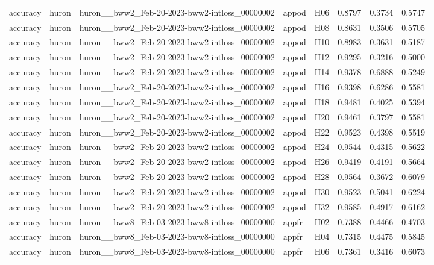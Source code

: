 \begin{table}[tbp]
\begin{tabular}{lllllrrr}
accuracy & huron & huron\_\_bww2\_Feb-20-2023-bww2-intloss\_00000002 & appod & H06 & 0.8797 & 0.3734 & 0.5747 \\
accuracy & huron & huron\_\_bww2\_Feb-20-2023-bww2-intloss\_00000002 & appod & H08 & 0.8631 & 0.3506 & 0.5705 \\
accuracy & huron & huron\_\_bww2\_Feb-20-2023-bww2-intloss\_00000002 & appod & H10 & 0.8983 & 0.3631 & 0.5187 \\
accuracy & huron & huron\_\_bww2\_Feb-20-2023-bww2-intloss\_00000002 & appod & H12 & 0.9295 & 0.3216 & 0.5000 \\
accuracy & huron & huron\_\_bww2\_Feb-20-2023-bww2-intloss\_00000002 & appod & H14 & 0.9378 & 0.6888 & 0.5249 \\
accuracy & huron & huron\_\_bww2\_Feb-20-2023-bww2-intloss\_00000002 & appod & H16 & 0.9398 & 0.6286 & 0.5581 \\
accuracy & huron & huron\_\_bww2\_Feb-20-2023-bww2-intloss\_00000002 & appod & H18 & 0.9481 & 0.4025 & 0.5394 \\
accuracy & huron & huron\_\_bww2\_Feb-20-2023-bww2-intloss\_00000002 & appod & H20 & 0.9461 & 0.3797 & 0.5581 \\
accuracy & huron & huron\_\_bww2\_Feb-20-2023-bww2-intloss\_00000002 & appod & H22 & 0.9523 & 0.4398 & 0.5519 \\
accuracy & huron & huron\_\_bww2\_Feb-20-2023-bww2-intloss\_00000002 & appod & H24 & 0.9544 & 0.4315 & 0.5622 \\
accuracy & huron & huron\_\_bww2\_Feb-20-2023-bww2-intloss\_00000002 & appod & H26 & 0.9419 & 0.4191 & 0.5664 \\
accuracy & huron & huron\_\_bww2\_Feb-20-2023-bww2-intloss\_00000002 & appod & H28 & 0.9564 & 0.3672 & 0.6079 \\
accuracy & huron & huron\_\_bww2\_Feb-20-2023-bww2-intloss\_00000002 & appod & H30 & 0.9523 & 0.5041 & 0.6224 \\
accuracy & huron & huron\_\_bww2\_Feb-20-2023-bww2-intloss\_00000002 & appod & H32 & 0.9585 & 0.4917 & 0.6162 \\
accuracy & huron & huron\_\_bww8\_Feb-03-2023-bww8-intloss\_00000000 & appfr & H02 & 0.7388 & 0.4466 & 0.4703 \\
accuracy & huron & huron\_\_bww8\_Feb-03-2023-bww8-intloss\_00000000 & appfr & H04 & 0.7315 & 0.4475 & 0.5845 \\
accuracy & huron & huron\_\_bww8\_Feb-03-2023-bww8-intloss\_00000000 & appfr & H06 & 0.7361 & 0.3416 & 0.6073 \\

\end{tabular}
\end{table}
